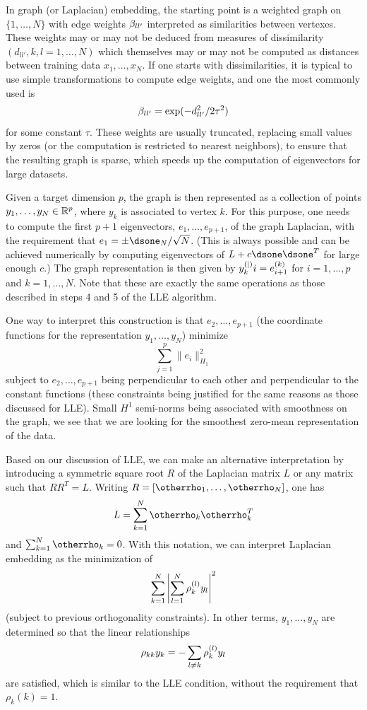 In graph (or Laplacian) embedding, the starting point is a weighted graph on $\{1, \ldots, N\}$ with edge weights $\beta_{ll'}$ interpreted as similarities between vertexes. These weights may or may not be deduced from measures of dissimilarity $(d_{ll'}, k,l=1, \ldots, N)$ which themselves may or may not be computed as distances between training data $x_1, \ldots, x_N$. If one starts with dissimilarities, it is typical to use simple transformations to compute edge weights, and one the most commonly used is
\[
\beta_{ll'} = \exp(-d_{ll'}^2/2\tau^2)
\]
for some constant $\tau$. These weights are usually truncated, replacing small values by zeros (or the computation is restricted to nearest neighbors), to ensure that the resulting graph is sparse, which speeds up the computation of eigenvectors for large datasets. 

Given a target dimension $p$, the graph is then represented as a collection of points $y_1, \ldots, y_N\in {\mathbb{R}}^p$, where $y_k$ is associated to vertex $k$. For this purpose, one needs to compute the first $p+1$ eigenvectors, $e_1, \ldots, e_{p+1}$, of the graph Laplacian, with the requirement that $e_1 = \pm \dsone_N/\sqrt{N}$. (This is always possible and  can be achieved numerically by computing eigenvectors of $L + c\dsone\dsone^T$ for large enough $c$.) The graph representation is then given by  $y_k^{(|)}i = e_{i+1}^{(k)}$ for $i=1, \ldots, p$ and $k=1, \ldots, N$. Note that these are exactly the same operations as those described in steps 4 and 5 of the LLE algorithm. 

One way to interpret this construction is that $e_2, \ldots, e_{p+1}$ (the coordinate functions for the representation $y_1, \ldots, y_N$) minimize
\[
\sum_{j=1}^p \|e_i\|^2_{H_1}
\]
subject to $e_2, \ldots, e_{p+1}$ being perpendicular to each other and perpendicular to the constant functions (these constraints being justified for the same reasons as those discussed for LLE). Small $H^1$ semi-norms being associated with smoothness on the graph, we see that we are looking for the smoothest zero-mean representation of the data.

Based on our discussion of LLE, we can make an alternative interpretation by introducing a symmetric square root $R$ of the Laplacian matrix $L$ or any matrix such that $RR^T = L$. Writing $R = [\bfrho_1, \ldots, \bfrho_N]$, one has
\[
L = \sum_{k=1}^N \bfrho_k \bfrho_k^T
\]
and $\sum_{k=1}^N  \bfrho_k = 0$. With this notation, we can interpret Laplacian embedding as the minimization of
\[
\sum_{k=1}^N \left| \sum_{l=1}^N \rho_{k}^{(l)} y_l\right|^2
\]
(subject to previous orthogonality constraints). In other terms, $y_1, \ldots, y_N$ are determined so that the linear relationships
\[
\rho_{kk} y_k = -\sum_{l\neq k} \rho_{k}^{(l)} y_l
\]
are satisfied, which is similar to the LLE condition, without the requirement that $\rho_{k}(k) = 1$. 

